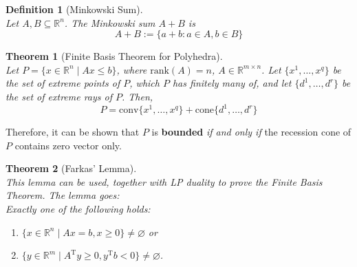 \documentclass[12pt]{article}
\newcommand{\rank}{\mathrm{rank}}
\newcommand{\T}{\mathrm{T}}
\newcommand{\cone}{\mathrm{cone}}
\newcommand{\conv}{\mathrm{conv}}
\newtheorem{definition}{Definition}[section]
\newtheorem{theorem}{Theorem}[section]
\theoremstyle{definition}
\begin{document}
\begin{definition}[Minkowski Sum]
\hfill\\\normalfont Let $A,B\subseteq \mathbb{R}^n$. The Minkowski sum $A+B$ is
\[
A+B:=\{a+b: a\in A, b\in B\}
\]
\end{definition}
\begin{theorem}[Finite Basis Theorem for Polyhedra]
\hfill\\\normalfont Let $P=\{x\in\mathbb{R}^n\mid Ax\leq b\}$, where $\rank(A) = n$, $A\in\mathbb{R}^{m\times n}$. Let $\{x^1,\ldots, x^q\}$ be the set of extreme points of $P$, which $P$ has finitely many of, and let $\{d^1,\ldots, d^r\}$ be the set of extreme rays of $P$. Then,
\[
P=\conv\{x^1,\ldots, x^q\}+\cone\{d^1,\ldots, d^r\}
\]
\end{theorem}
Therefore, it can be shown that $P$ is \textbf{bounded} \textit{if and only if} the recession cone of $P$ contains zero vector only.
\begin{theorem}[Farkas' Lemma]
\hfill\\\normalfont This lemma can be used, together with LP duality to prove the Finite Basis Theorem. The lemma goes:\\
Exactly one of the following holds:
\begin{enumerate}
	\item $\{x\in\mathbb{R}^n\mid Ax=b,x\geq 0\}\neq \varnothing$ or
	\item $\{y\in\mathbb{R}^m\mid A^\T y\geq 0, y^\T b<0\}\neq \varnothing$.
\end{enumerate}
\end{theorem}
\end{document}

